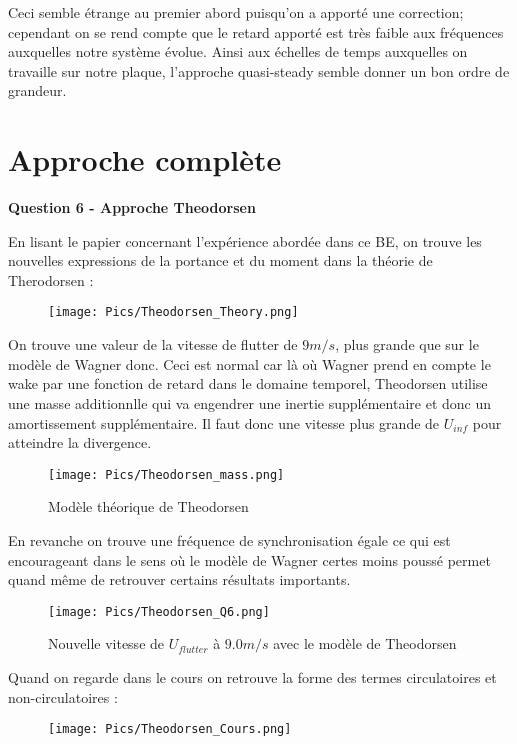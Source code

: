 \documentclass[conference]{IEEEtran}
\begin{document}
Ceci semble étrange au premier abord puisqu'on a apporté une correction; cependant on se rend compte que le retard apporté est très faible aux fréquences auxquelles notre système évolue. Ainsi aux échelles de temps auxquelles on travaille sur notre plaque, l'approche quasi-steady semble donner un bon ordre de grandeur. 

\section{Approche complète}

\textbf{Question 6 - Approche Theodorsen}

En lisant le papier concernant l'expérience abordée dans ce BE, on trouve les nouvelles expressions de la portance et du moment dans la théorie de Therodorsen : 


\begin{figure}[H]
    \texttt{[image: Pics/Theodorsen\_Theory.png]}
\end{figure}

On trouve une valeur de la vitesse de flutter de $9m/s$, plus grande que sur le modèle de Wagner donc. Ceci est normal car là où Wagner prend en compte le wake par une fonction de retard dans le domaine temporel, Theodorsen utilise une masse additionnlle qui va engendrer une inertie supplémentaire et donc un amortissement supplémentaire. Il faut donc une vitesse plus grande de $U_{inf}$ pour atteindre la divergence. 

\begin{figure}[H]
  \texttt{[image: Pics/Theodorsen\_mass.png]}
  \caption{Modèle théorique de Theodorsen}
  \label{fig:boat1}
\end{figure}


En revanche on trouve une fréquence de synchronisation égale ce qui est encourageant dans le sens où le modèle de Wagner certes moins poussé permet quand même de retrouver certains résultats importants. 

\begin{figure}[H]
  \texttt{[image: Pics/Theodorsen\_Q6.png]}
  \caption{Nouvelle vitesse de $U_{flutter}$ à $9.0m/s$ avec le modèle de Theodorsen}
  \label{fig:boat1}
\end{figure}

Quand on regarde dans le cours on retrouve la forme des termes circulatoires et non-circulatoires : 

\begin{figure}[H]
    \texttt{[image: Pics/Theodorsen\_Cours.png]}
\end{figure}
\end{document}
